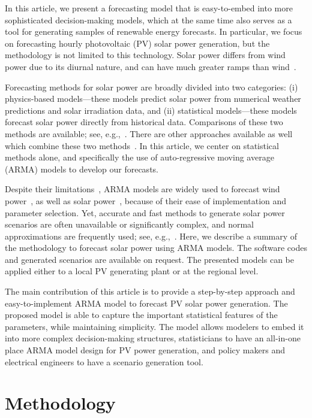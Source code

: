 \documentclass[11pt]{article} %
\begin{document}
In this article, we present a forecasting model that is easy-to-embed into more 
sophisticated decision-making models, which at the same time also serves as a 
tool for generating samples of renewable energy forecasts.  In 
particular, we focus on 
forecasting  hourly photovoltaic  (PV) solar power generation, but the 
methodology is not 
limited to this technology.  Solar power differs from wind power due 
to its diurnal nature, and can have much greater  ramps than 
wind~\cite{graabak2016variability}. 

Forecasting methods for solar power are broadly divided 
into two categories: (i) physics-based models---these models predict solar 
power 
from numerical weather predictions and solar irradiation data, and (ii) 
statistical models---these 
models forecast 
solar power directly from historical data. Comparisons of these two 
methods are available; see, 
e.g.,~\cite{huang2010comparative}. There are other 
approaches available as well which combine these two 
methods~\cite{dong2015novel}. 
In this article, we center on  statistical  methods alone, and specifically the 
use of auto-regressive moving average (ARMA) 
models to develop our forecasts. 

Despite 
their limitations~\cite{yang2018history}, ARMA models
are widely used to forecast wind power~\cite{duran2007short}, as well as solar 
power~\cite{mora1998multiplicative}, because of their ease of 
implementation and parameter selection.  Yet, accurate and 
fast methods to generate solar power scenarios are often unavailable or 
significantly complex, and normal approximations are frequently used; see, 
e.g.,~\cite{su2014stochastic}. 
Here, 
we describe a summary of the methodology to forecast solar power using 
ARMA models. The software codes and generated scenarios are 
available on request. The presented models can 
be applied either to a local PV generating plant or  at the regional 
level.

The main contribution of this article is to provide a step-by-step approach and 
easy-to-implement ARMA model to forecast PV solar power generation. The 
proposed model is able to capture the important statistical features of the 
parameters, while maintaining simplicity. The model allows modelers to embed
it into more complex decision-making structures, statisticians to have an 
all-in-one place ARMA model design for PV power generation, and policy makers and electrical engineers to have a scenario generation tool. 

\section{Methodology} \label{sec:methodology}
\end{document}

